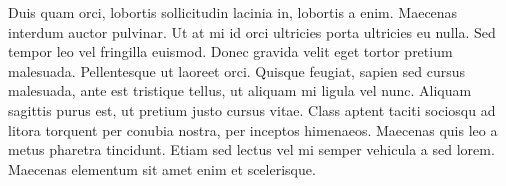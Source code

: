 \documentclass[a4paper,10pt]{report}
\begin{document}
Duis quam orci, lobortis sollicitudin lacinia in, lobortis a enim. Maecenas interdum auctor pulvinar.
Ut at mi id orci ultricies porta ultricies eu nulla. Sed tempor leo vel fringilla euismod. Donec gravida velit
eget tortor pretium malesuada. Pellentesque ut laoreet orci. Quisque feugiat, sapien sed cursus malesuada,
ante est tristique tellus, ut aliquam mi ligula vel nunc. Aliquam sagittis purus est, ut pretium justo cursus vitae.
Class aptent taciti sociosqu ad litora torquent per conubia nostra, per inceptos himenaeos.
Maecenas quis leo a metus pharetra tincidunt. Etiam sed lectus vel mi semper vehicula a sed lorem.
Maecenas elementum sit amet enim et scelerisque.
\end{document}
